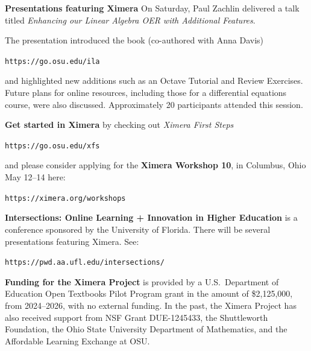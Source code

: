 \documentclass{techbrief}
\begin{document}
\break

\begin{xframe}
    \textbf{Presentations featuring Ximera}
    On Saturday, Paul Zachlin delivered a talk titled \textit{Enhancing our
        Linear
        Algebra OER with Additional Features}.

    The presentation introduced the book (co-authored with Anna Davis)
    \begin{center}
    \texttt{https://go.osu.edu/ila}
    \end{center}
    and highlighted new additions such as
    an Octave Tutorial and Review Exercises. Future plans for online resources,
    including those for a differential equations course, were also discussed.
    Approximately 20 participants attended this session.
\end{xframe}

\vfil

\begin{xframe}
    \textbf{Get started in Ximera} by checking out \textit{Ximera First Steps}
   \begin{center}\small
        \texttt{https://go.osu.edu/xfs}
    \end{center}
and please consider applying for the \textbf{Ximera Workshop 10}, in Columbus, Ohio May 12--14 here:
\begin{center}\small
    \texttt{https://ximera.org/workshops}
\end{center} 
\end{xframe}

\vfil
\begin{xframe}
    {\bfseries Intersections: Online Learning + Innovation in Higher
        Education} is a conference sponsored by the University of Florida. There will be several presentations featuring Ximera. See:
        \begin{center}\small
            \texttt{https://pwd.aa.ufl.edu/intersections/}
        \end{center}       
\end{xframe}



\begin{xframe}
    \textbf{Funding for the Ximera Project} is provided by
    a U.S.\ Department of Education Open Textbooks Pilot Program grant in the
    amount of \$2,125,000, from 2024--2026, with no external funding. In the
    past, the Ximera Project has
    also received support from NSF Grant DUE-1245433, the Shuttleworth
    Foundation, the Ohio State University
    Department of Mathematics, and the Affordable Learning Exchange at OSU.
\end{xframe}

\vfill
\end{document}
